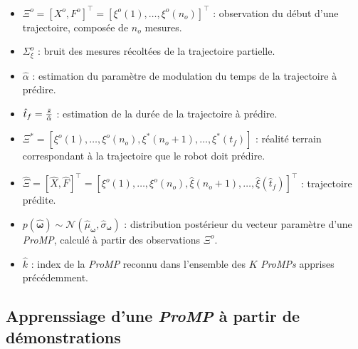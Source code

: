 \documentclass[utf8]{frontiersSCNS} %
\newcommand{\todo}[1]{\textcolor{red}{\textbf{/*#1*/}}}
\begin{document}
\begin{itemize}
\item $\Xi^o =[X^o, F^o]^\top = [\xi^o(1),\ldots, \xi^o(n_o)]^\top$ : observation du début d'une trajectoire, composée de $n_o$ mesures.
\item $\Sigma_\xi^o$ : bruit des mesures récoltées de la trajectoire partielle.
\item $\hat{\alpha}$ : estimation du paramètre de modulation du temps de la trajectoire à prédire.
\item $\hat{t}_f ={\bar{s} \over \hat{\alpha}}$ : estimation de la durée de la trajectoire à prédire.
\item $\Xi^* = [\xi^o(1),\ldots, \xi^o(n_o), \xi^*(n_o+1),\ldots, \xi^*(t_f)]$ : réalité terrain correspondant à la trajectoire que le robot doit prédire.
\item $\hat{\Xi} =[\hat{X}, \hat{F}]^\top = [\xi^o(1),\ldots, \xi^o(n_o), \hat{\xi}(n_o + 1),\ldots,\hat{\xi}(\hat{t}_f)]^\top$ : trajectoire prédite.
\item $p(\hat{\boldsymbol{\omega}}) \sim \mathcal{N}(\hat{\mu}_{\boldsymbol{\omega}}, \hat{\sigma}_{\boldsymbol{\omega}})$ : distribution postérieur du vecteur paramètre d'une \textit{ProMP}, calculé à partir des observations $\Xi^o$.
\item $\hat{k}$ : index de la \textit{ProMP} reconnu dans l'ensemble des $K$ \textit{ProMPs} apprises précédemment.
\end{itemize}


\subsection{Apprenssiage d'une \textit{ProMP} à partir de démonstrations}
\label{LearningSimpleProMP}
\end{document}
